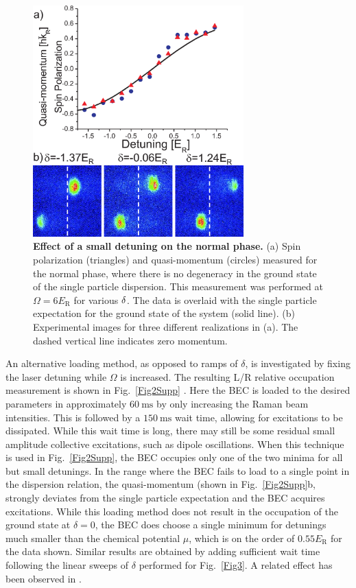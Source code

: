 \documentclass[prl,aps,twocolumn,floatfix]{revtex4}
\begin{document}
\begin{figure}[bp]
\centering
\includegraphics[width=3.2in]{SuppFigure-1Engels.eps}
\caption{\textbf{Effect of a small detuning on the normal phase.}  (a) Spin
polarization (triangles) and quasi-momentum (circles) measured for the
normal phase, where there is no degeneracy in the ground state of the single
particle dispersion. This measurement was performed at $\Omega =6E_{\text{R}}
$ for various $\protect\delta $. The data is overlaid with the single
particle expectation for the ground state of the system (solid line). (b)
Experimental images for three different realizations in (a). The dashed
vertical line indicates zero momentum.}
\label{Fig1Supp}
\end{figure}

An alternative loading method, as opposed to ramps of $\delta$, is
investigated by fixing the laser detuning while $\Omega$ is increased. The
resulting L/R relative occupation measurement is shown in Fig.~\ref{Fig2Supp}%
. Here the BEC is loaded to the desired parameters in approximately $60~%
\text{ms}$ by only increasing the Raman beam intensities. This is followed
by a $150~\text{ms}$ wait time, allowing for excitations to be dissipated.
While this wait time is long, there may still be some residual small
amplitude collective excitations, such as dipole oscillations. When this
technique is used in Fig.~\ref{Fig2Supp}, the BEC occupies only one of the
two minima for all but small detunings. In the range where the BEC fails to
load to a single point in the dispersion relation, the quasi-momentum (shown
in Fig.~\ref{Fig2Supp}b, strongly deviates from the single
particle expectation and the BEC acquires excitations. While this loading
method does not result in the occupation of the ground state at $\delta=0$,
the BEC does choose a single minimum for detunings much smaller than the
chemical potential $\mu$, which is on the order of $0.55 E_\text{R}$ for the
data shown. Similar results are obtained by adding sufficient wait time
following the linear sweeps of $\delta$ performed for Fig.~\ref{Fig3}. A
related effect has been observed in \cite{Pan2}.
\end{document}
